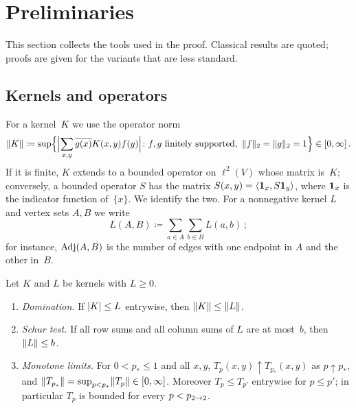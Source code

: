 \section{Preliminaries}\label{sec:prelim}

This section collects the tools used in the proof. Classical results are quoted; proofs are given for
the variants that are less standard.

\subsection{Kernels and operators}\label{sec:kernels}

For a kernel~$K$ we use the operator norm
\begin{equation*}
  \norm{K}\coloneqq\sup\Bigl\{\Bigl|\sum_{x,y}\overline{g(x)}K(x,y)f(y)\Bigr|\colon
  f,g\text{ finitely supported},\ \norm{f}_2=\norm{g}_2=1\Bigr\}\in[0,\infty]\,.
\end{equation*}
If it is finite, $K$ extends to a bounded operator on $\ell^2(V)$ whose matrix is~$K$; conversely, a
bounded operator $S$ has the matrix $S(x,y)=\langle\mathbf{1}_x,S\mathbf{1}_y\rangle$, where $\mathbf{1}_x$ is the indicator
function of~$\{x\}$. We identify the two.
For a nonnegative kernel $L$ and vertex sets $A,B$ we write
\begin{equation*}
  L(A,B)\coloneqq\sum_{a\in A}\sum_{b\in B}L(a,b)\,;
\end{equation*}
for instance, $\operatorname{Adj}(A,B)$ is the number of edges with one endpoint in $A$ and the other in~$B$.

\begin{lemma}\label{lem:kernels}
Let $K$ and $L$ be kernels with $L\ge0$.
\begin{enumerate}[label=\textup{(\alph*)}]
  \item\label{it:domination} \emph{Domination.} If $\lvert K\rvert\le L$ entrywise, then $\lVert K\rVert\le\lVert L\rVert$.
  \item\label{it:schur} \emph{Schur test.} If all row sums and all column sums of $L$ are at most~$b$,
  then $\lVert L\rVert\le b$.
  \item\label{it:monotone} \emph{Monotone limits.} For $0<p_*\le1$ and all $x,y$,
  $T_p(x,y)\uparrow T_{p_*}(x,y)$ as $p\uparrow p_*$, and
  $\lVert T_{p_*}\rVert=\sup_{p<p_*}\lVert T_p\rVert\in[0,\infty]$. Moreover $T_p\le T_{p'}$ entrywise for
  $p\le p'$; in particular $T_p$ is bounded for every $p<p_{2\to 2}$.
\end{enumerate}
\end{lemma}

